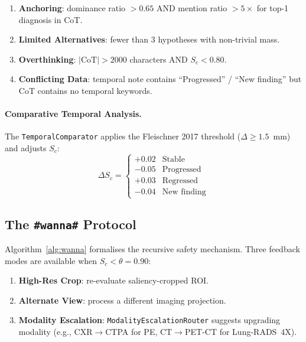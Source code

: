 \documentclass[10pt,twocolumn]{article}
\begin{document}
\begin{enumerate}[noitemsep,leftmargin=*]
  \item \textbf{Anchoring}: dominance ratio $> 0.65$ AND mention ratio $> 5\times$ for
    top-1 diagnosis in CoT.
  \item \textbf{Limited Alternatives}: fewer than 3 hypotheses with non-trivial mass.
  \item \textbf{Overthinking}: $|\text{CoT}| > 2000$ characters AND $S_c < 0.80$.
  \item \textbf{Conflicting Data}: temporal note contains ``Progressed'' / ``New finding''
    but CoT contains no temporal keywords.
\end{enumerate}

\paragraph{Comparative Temporal Analysis.}
The \texttt{TemporalComparator} applies the Fleischner 2017 threshold
($\Delta \ge 1.5$~mm) and adjusts $S_c$:
\[
\Delta S_c =
\begin{cases}
  +0.02 & \text{Stable} \\
  -0.05 & \text{Progressed} \\
  +0.03 & \text{Regressed} \\
  -0.04 & \text{New finding}
\end{cases}
\]

\subsection{The \texttt{\#wanna\#} Protocol}
\label{ssec:wanna}

Algorithm~\ref{alg:wanna} formalises the recursive safety mechanism.
Three feedback modes are available when $S_c < \theta = 0.90$:

\begin{enumerate}[noitemsep,leftmargin=*]
  \item \textbf{High-Res Crop}: re-evaluate saliency-cropped ROI.
  \item \textbf{Alternate View}: process a different imaging projection.
  \item \textbf{Modality Escalation}: \texttt{ModalityEscalationRouter} suggests
    upgrading modality (e.g., CXR$\to$CTPA for PE, CT$\to$PET-CT for Lung-RADS~4X).
\end{enumerate}
\end{document}
